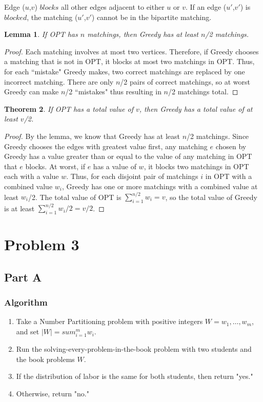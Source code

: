\documentclass{article}
\newenvironment{definition}[1][Definition]{\begin{trivlist}
\item[\hskip \labelsep {\bfseries #1}]}{\end{trivlist}}
\newtheorem{theorem}{Theorem}[section]
\newtheorem{lemma}[theorem]{Lemma}
\begin{document}
\begin{definition}
Edge ($u$,$v$) $blocks$ all other edges adjacent to either $u$ or $v$. If an edge ($u'$,$v'$) is $blocked$, the matching ($u'$,$v'$) cannot be in the bipartite matching.
\end{definition}

\begin{lemma}
If OPT has $n$ matchings, then Greedy has at least $n$/2 matchings.
\end{lemma}
\begin{proof}
Each matching involves at most two vertices. Therefore, if Greedy chooses a matching that is not in OPT, it blocks at most two matchings in OPT. Thus, for each ``mistake" Greedy makes, two correct matchings are replaced by one incorrect matching. There are only $n$/2 pairs of correct matchings, so at worst Greedy can make $n$/2 ``mistakes" thus resulting in $n$/2 matchings total.
\end{proof}
\begin{theorem}
If OPT has a total value of $v$, then Greedy has a total value of at least $v$/2.
\end{theorem}
\begin{proof}
By the lemma, we know that Greedy has at least $n$/2 matchings. Since Greedy chooses the edges with greatest value first, any matching $e$ chosen by Greedy has a value greater than or equal to the value of any matching in OPT that $e$ blocks. At worst, if $e$ has a value of $w$, it blocks two matchings in OPT each with a value $w$. Thus, for each disjoint pair of matchings $i$ in OPT with a combined value $w_i$, Greedy has one or more matchings with a combined value at least $w_i$/2. The total value of OPT is $\sum_{i=1}^{n/2} w_i = v$, so the total value of Greedy is at least $\sum_{i=1}^{n/2} w_i/2 = v/2$.


\end{proof}


\section{Problem 3}
\subsection{Part A}

\subsubsection{Algorithm}
\begin{enumerate}
\item Take a Number Partitioning problem with positive integers $W = w_1, \dots , w_m$, and set $|W| = sum_{i=1}^m w_i$.
\item Run the solving-every-problem-in-the-book problem with two students and the book problems $W$.
\item If the distribution of labor is the same for both students, then return "yes."
\item Otherwise, return "no."
\end{enumerate}
\end{document}
